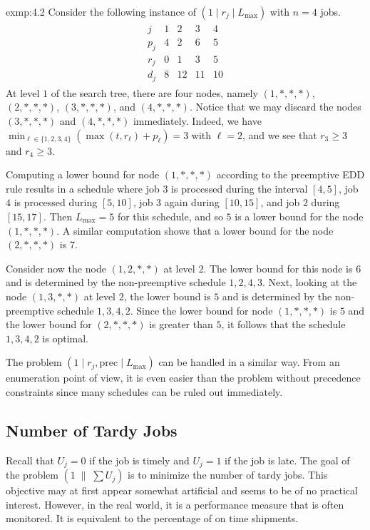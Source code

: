 \begin{exmp}{exmp:4.2}
    Consider the following instance of $(1 \mid r_j \mid L_{\max})$ with 
    $n = 4$ jobs. 
    \begin{align*}
        \begin{array}{c|cccc} 
            j & 1 & 2 & 3 & 4 \\ \hline 
            p_j & 4 & 2 & 6 & 5 \\ 
            r_j & 0 & 1 & 3 & 5 \\ 
            d_j & 8 & 12 & 11 & 10 
        \end{array}
    \end{align*}
    At level $1$ of the search tree, there are four nodes, namely 
    $(1, *, *, *)$, $(2, *, *, *)$, $(3, *, *, *)$, and $(4, *, *, *)$. 
    Notice that we may discard the nodes $(3, *, *, *)$ and 
    $(4, *, *, *)$ immediately. Indeed, we have $\min_{\ell\in \{1, 2, 3, 4\}} 
    (\max(t, r_\ell) + p_\ell) = 3$ with $\ell = 2$, and we see that 
    $r_3 \geq 3$ and $r_4 \geq 3$. 

    Computing a lower bound for node $(1, *, *, *)$ according to the 
    preemptive EDD rule results in a schedule where job $3$ is processed 
    during the interval $[4, 5]$, job $4$ is processed during $[5, 10]$, 
    job $3$ again during $[10, 15]$, and job $2$ during $[15, 17]$. 
    Then $L_{\max} = 5$ for this schedule, and so $5$ is a lower bound 
    for the node $(1, *, *, *)$. A similar computation shows that a lower 
    bound for the node $(2, *, *, *)$ is $7$. 

    Consider now the node $(1, 2, *, *)$ at level $2$. The lower bound 
    for this node is $6$ and is determined by the non-preemptive 
    schedule $1, 2, 4, 3$. Next, looking at the node $(1, 3, *, *)$ 
    at level $2$, the lower bound is $5$ and is determined by the 
    non-preemptive schedule $1, 3, 4, 2$. Since the lower bound for node 
    $(1, *, *, *)$ is $5$ and the lower bound for $(2, *, *, *)$ is 
    greater than $5$, it follows that the schedule $1, 3, 4, 2$ is optimal. 
\end{exmp}

The problem $(1 \mid r_j, \text{prec} \mid L_{\max})$ can be handled in a similar 
way. From an enumeration point of view, it is even easier than the problem 
without precedence constraints since many schedules can be ruled out 
immediately. 

\subsection{Number of Tardy Jobs} \label{subsec:4.2}
Recall that $U_j = 0$ if the job is timely and $U_j = 1$ if the job is late. 
The goal of the problem $(1\;\|\;\sum U_j)$ is to minimize the number of 
tardy jobs. This objective may at first appear somewhat artificial and 
seems to be of no practical interest. However, in the real world, it is a 
performance measure that is often monitored. It is equivalent to the 
percentage of on time shipments.

